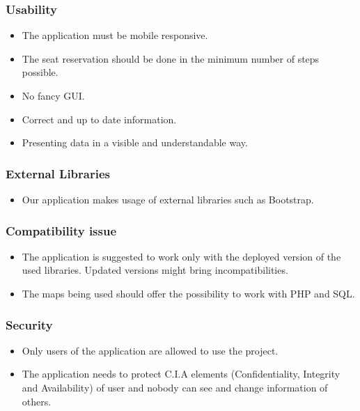 \subsubsection{Usability}
\begin{itemize}
	\item The application must be mobile responsive.
	\item The seat reservation should be done in the minimum number of steps possible.
	\item No fancy GUI.
	\item Correct and up to date information.
	\item Presenting data in a visible and understandable way.	
\end{itemize}
\subsubsection{External Libraries}
\begin{itemize}
	\item Our application makes usage of external libraries such as Bootstrap.
\end{itemize}
\subsubsection{Compatibility issue}
\begin{itemize}
	\item The application is suggested to work only with the deployed version of the used libraries. Updated versions might bring incompatibilities. 
	\item The maps being used should offer the possibility to work with PHP and SQL.
\end{itemize}
\subsubsection{Security}
\begin{itemize}
	\item Only users of the application are allowed to use the project. 
	\item The application needs to protect C.I.A elements (Confidentiality, Integrity and Availability) of user and nobody can see and change information of others.
\end{itemize}
\newpage
